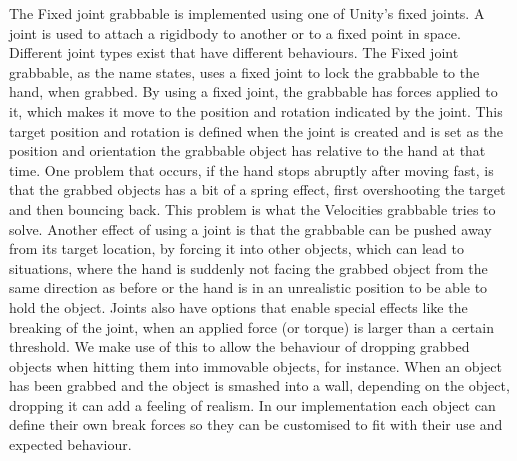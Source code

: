 The Fixed joint grabbable is implemented using one of Unity's fixed joints. A joint is used to attach a rigidbody to another or to a fixed point in space. Different joint types exist that have different behaviours. The Fixed joint grabbable, as the name states, uses a fixed joint to lock the grabbable to the hand, when grabbed. By using a fixed joint, the grabbable has forces applied to it, which makes it move to the position and rotation indicated by the joint. This target position and rotation is defined when the joint is created and is set as the position and orientation the grabbable object has relative to the hand at that time. One problem that occurs, if the hand stops abruptly after moving fast, is that the grabbed objects has a bit of a spring effect, first overshooting the target and then bouncing back. This problem is what the Velocities grabbable tries to solve. Another effect of using a joint is that the grabbable can be pushed away from its target location, by forcing it into other objects, which can lead to situations, where the hand is suddenly not facing the grabbed object from the same direction as before or the hand is in an unrealistic position to be able to hold the object.  Joints also have options that enable special effects like the breaking of the joint, when an applied force (or torque) is larger than a certain threshold. We make use of this to allow the behaviour of dropping grabbed objects when hitting them into immovable objects, for instance. When an object has been grabbed and the object is smashed into a wall, depending on the object, dropping it can add a feeling of realism. In our implementation each object can define their own break forces so they can be customised to fit with their use and expected behaviour.

